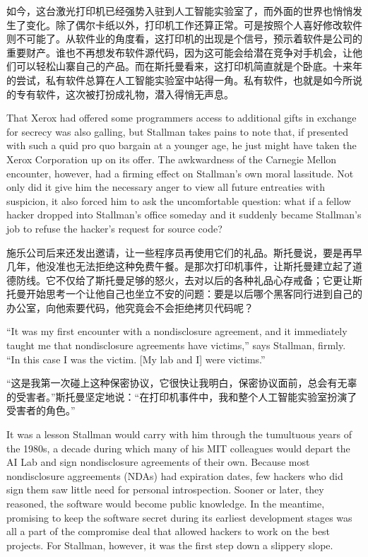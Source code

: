 \ifdefined\chs
如今，这台激光打印机已经强势入驻到人工智能实验室了，而外面的世界也悄悄发生了变化。除了偶尔卡纸以外，打印机工作还算正常。可是按照个人喜好修改软件则不可能了。从软件业的角度看，这打印机的出现是个信号，预示着软件是公司的重要财产。谁也不再想发布软件源代码，因为这可能会给潜在竞争对手机会，让他们可以轻松山寨自己的产品。而在斯托曼看来，这打印机简直就是个卧底。十来年的尝试，私有软件总算在人工智能实验室中站得一角。私有软件，也就是如今所说的专有软件，这次被打扮成礼物，潜入得悄无声息。
\fi

\ifdefined\eng
That Xerox had offered some programmers access to additional gifts in exchange
for secrecy was also galling, but Stallman takes pains to note that, if
presented with such a quid pro quo bargain at a younger age, he just might have
taken the Xerox Corporation up on its offer. The awkwardness of the Carnegie
Mellon encounter, however, had a firming effect on Stallman's own moral
lassitude. Not only did it give him the necessary anger to view all future
entreaties with suspicion, it also forced him to ask the uncomfortable question:
what if a fellow hacker dropped into Stallman's office someday and it suddenly
became Stallman's job to refuse the hacker's request for source code?
\fi

\ifdefined\chs
施乐公司后来还发出邀请，让一些程序员再使用它们的礼品。斯托曼说，要是再早几年，他没准也无法拒绝这种免费午餐。是那次打印机事件，让斯托曼建立起了道德防线。它不仅给了斯托曼足够的怒火，去对以后的各种礼品心存戒备；它更让斯托曼开始思考一个让他自己也坐立不安的问题：要是以后哪个黑客同行进到自己的办公室，向他索要代码，他究竟会不会拒绝拷贝代码呢？
\fi

\ifdefined\eng
``It was my first encounter with a nondisclosure agreement, and it immediately
taught me that nondisclosure agreements have victims,'' says Stallman, firmly.
``In this case I was the victim. [My lab and I] were victims.'' 
\fi

\ifdefined\chs
``这是我第一次碰上这种保密协议，它很快让我明白，保密协议面前，总会有无辜的受害者。''斯托曼坚定地说：``在打印机事件中，我和整个人工智能实验室扮演了受害者的角色。''
\fi

\ifdefined\eng
It was a lesson Stallman would carry with him through the tumultuous years of the 1980s, a decade during which many of his MIT colleagues would depart the AI Lab and sign nondisclosure agreements of their own. Because most nondisclosure aggreements (NDAs) had expiration dates, few hackers who did sign them saw little need for personal introspection. Sooner or later, they reasoned, the software would become public knowledge. In the meantime, promising to keep the software secret during its earliest development stages was all a part of the compromise deal that allowed hackers to work on the best projects. For Stallman, however, it was the first step down a slippery slope.
\fi

